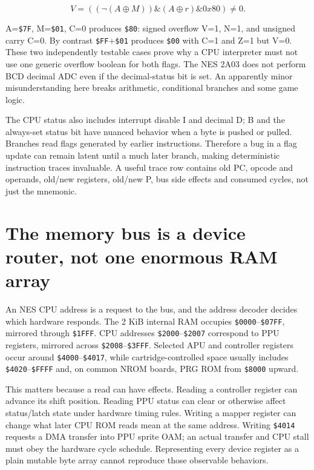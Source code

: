 \[
V= ((\neg(A\oplus M))\mathbin{\&}(A\oplus r)\mathbin{\&}0x80)\ne0.
\]

A=\texttt{\$7F}, M=\texttt{\$01}, C=0 produces \texttt{\$80}: signed overflow V=1, N=1, and unsigned carry C=0. By contrast \texttt{\$FF}+\texttt{\$01} produces \texttt{\$00} with C=1 and Z=1 but V=0. These two independently testable cases prove why a CPU interpreter must not use one generic overflow boolean for both flags. The NES 2A03 does not perform BCD decimal ADC even if the decimal-status bit is set. An apparently minor misunderstanding here breaks arithmetic, conditional branches and some game logic.

The CPU status also includes interrupt disable I and decimal D; B and the always-set status bit have nuanced behavior when a byte is pushed or pulled. Branches read flags generated by earlier instructions. Therefore a bug in a flag update can remain latent until a much later branch, making deterministic instruction traces invaluable. A useful trace row contains old PC, opcode and operands, old/new registers, old/new P, bus side effects and consumed cycles, not just the mnemonic.

\section{The memory bus is a device router, not one enormous RAM array}\label{01-foundations-i-ch016-the-memory-bus-is-a-device-router-not-one-enormous-ram-array}

An NES CPU address is a request to the bus, and the address decoder decides which hardware responds. The 2 KiB internal RAM occupies \texttt{\$0000}--\texttt{\$07FF}, mirrored through \texttt{\$1FFF}. CPU addresses \texttt{\$2000}--\texttt{\$2007} correspond to PPU registers, mirrored across \texttt{\$2008}--\texttt{\$3FFF}. Selected APU and controller registers occur around \texttt{\$4000}--\texttt{\$4017}, while cartridge-controlled space usually includes \texttt{\$4020}--\texttt{\$FFFF} and, on common NROM boards, PRG ROM from \texttt{\$8000} upward.

This matters because a read can have effects. Reading a controller register can advance its shift position. Reading PPU status can clear or otherwise affect status/latch state under hardware timing rules. Writing a mapper register can change what later CPU ROM reads mean at the same address. Writing \texttt{\$4014} requests a DMA transfer into PPU sprite OAM; an actual transfer and CPU stall must obey the hardware cycle schedule. Representing every device register as a plain mutable byte array cannot reproduce those observable behaviors.

